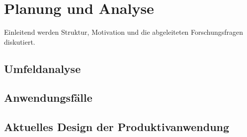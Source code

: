 

\chapter{Planung und Analyse}

Einleitend werden Struktur, Motivation und die abgeleiteten Forschungsfragen diskutiert.

\section{Umfeldanalyse}
\blindtext

\section{Anwendungsfälle}
\blindtext

\section{Aktuelles Design der Produktivanwendung}
\blindtext
